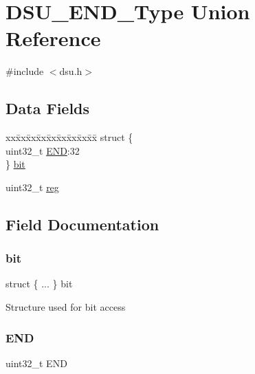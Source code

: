 \hypertarget{union_d_s_u___e_n_d___type}{}\section{D\+S\+U\+\_\+\+E\+N\+D\+\_\+\+Type Union Reference}
\label{union_d_s_u___e_n_d___type}


{\ttfamily \#include $<$dsu.\+h$>$}

\subsection*{Data Fields}
\begin{DoxyCompactItemize}
\item 
\begin{tabbing}
xx\=xx\=xx\=xx\=xx\=xx\=xx\=xx\=xx\=\kill
struct \{\\
\>uint32\_t \mbox{\hyperlink{union_d_s_u___e_n_d___type_af277b315c1b43fe00b788fdf5d3dd540}{END}}:32\\
\} \mbox{\hyperlink{union_d_s_u___e_n_d___type_a8c9c67ff2cd637a588d650db24c85e2f}{bit}}\\

\end{tabbing}\item 
uint32\+\_\+t \mbox{\hyperlink{union_d_s_u___e_n_d___type_a6b91636401516a477989a336376d7b40}{reg}}
\end{DoxyCompactItemize}


\subsection{Field Documentation}
\mbox{\label{union_d_s_u___e_n_d___type_a8c9c67ff2cd637a588d650db24c85e2f}} 
\subsubsection{\texorpdfstring{bit}{bit}}
{\footnotesize\ttfamily struct \{ ... \}   bit}

Structure used for bit access \mbox{\label{union_d_s_u___e_n_d___type_af277b315c1b43fe00b788fdf5d3dd540}} 
\subsubsection{\texorpdfstring{END}{END}}
{\footnotesize\ttfamily uint32\+\_\+t E\+ND}

